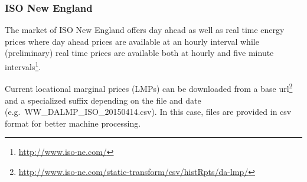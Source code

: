 %
%
%
%
%
%
%
%




\subsubsection{ISO New England}

The market of ISO New England offers day ahead as well as real time energy prices where day ahead prices are available at an hourly interval while (preliminary) real time prices are available both at hourly and five minute intervals\footnote{\url{http://www.iso-ne.com/}}. 

Current locational marginal prices (LMPs) can be downloaded from a base url\footnote{\url{http://www.iso-ne.com/static-transform/csv/histRpts/da-lmp/}} and a specialized suffix depending on the file and date (e.g.~WW\_DALMP\_ISO\_20150414.csv). In this case, files are provided in csv format for better machine processing. 

